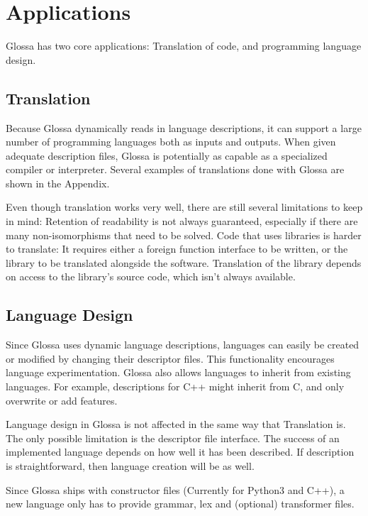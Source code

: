 \documentclass{article}
\begin{document}
\section{Applications}

Glossa has two core applications: Translation of code, and programming language design.

\subsection{Translation}

Because Glossa dynamically reads in language descriptions, it can support a large number of programming languages both as inputs and outputs.
When given adequate description files, Glossa is potentially as capable as a specialized compiler or interpreter.
Several examples of translations done with Glossa are shown in the Appendix.

Even though translation works very well, there are still several limitations to keep in mind:
Retention of readability is not always guaranteed, especially if there are many non-isomorphisms that need to be solved.
Code that uses libraries is harder to translate: 
It requires either a foreign function interface to be written, or the library to be translated alongside the software. 
Translation of the library depends on access to the library's source code, which isn't always available.

\subsection{Language Design}

Since Glossa uses dynamic language descriptions, languages can easily be created or modified by changing their descriptor files. 
This functionality encourages language experimentation.
Glossa also allows languages to inherit from existing languages. 
For example, descriptions for C++ might inherit from C, and only overwrite or add features.

Language design in Glossa is not affected in the same way that Translation is.
The only possible limitation is the descriptor file interface.
The success of an implemented language depends on how well it has been described.
If description is straightforward, then language creation will be as well.

Since Glossa ships with constructor files (Currently for Python3 and C++), a new language only has to provide grammar, lex and (optional) transformer files.
\end{document}
